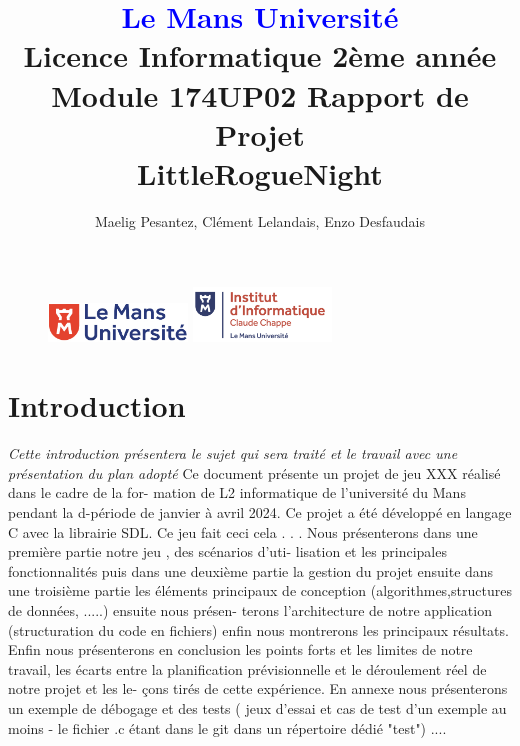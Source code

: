 \documentclass[10pt]{article}
\begin{document}
\begin{figure}
\includegraphics[width=3.7cm]{logolemansU.png}
\hspace{160pt}
\includegraphics[width=3.7cm]{logo_IC2.png}
\end{figure}

\title{\textbf{\textcolor{blue}{Le Mans Université}}\\Licence Informatique 2ème année\\Module 174UP02 Rapport de Projet\\\textbf{LittleRogueNight}}
\author{Maelig Pesantez, Clément Lelandais, Enzo Desfaudais}
\maketitle

\newpage
\tableofcontents

\newpage

\section{Introduction}
\textit{Cette introduction présentera le sujet qui sera traité et le travail avec une
présentation du plan adopté}
Ce document présente un projet de jeu XXX réalisé dans le cadre de la for-
mation de L2 informatique de l’université du Mans pendant la d-période de
janvier à avril 2024. Ce projet a été développé en langage C avec la librairie
SDL. Ce jeu fait ceci cela . . .
Nous présenterons dans une première partie notre jeu , des scénarios d’uti-
lisation et les principales fonctionnalités puis dans une deuxième partie la
gestion du projet ensuite dans une troisième partie les éléments principaux
de conception (algorithmes,structures de données, .....) ensuite nous présen-
terons l’architecture de notre application (structuration du code en fichiers)
enfin nous montrerons les principaux résultats. Enfin nous présenterons en
conclusion les points forts et les limites de notre travail, les écarts entre la
planification prévisionnelle et le déroulement réel de notre projet et les le-
çons tirés de cette expérience. En annexe nous présenterons un exemple de
débogage et des tests ( jeux d’essai et cas de test d’un exemple au moins -
le fichier .c étant dans le git dans un répertoire dédié "test") ....
\end{document}
